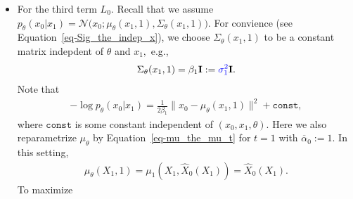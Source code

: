 \documentclass[
]{article}
\theoremstyle{remark}
\begin{document}
\begin{itemize}
  (2023)). DDPM chooses to predict the noise
  \(\overline{\mathcal{E}}_t.\) Then by Equation~\ref{eq-estimator-X0},
  we have the following relation
  \begin{equation}\phantomsection\label{eq-Net_asssume1}{
  \begin{aligned}
    X_t = \sqrt{\overline{\alpha}_t} \cdot \widehat{X}_0(X_t) + \sqrt{1-\overline{\alpha}_t} \cdot \mathtt{Net}_{\theta}(X_t,t).
  \end{aligned}
  }\end{equation} Note that
  \(\widehat{X}_0 = \widehat{X}_0(X_t)=\widehat{X}_0(X_t,\theta).\)
  Hence, we have \[
  \begin{aligned}
    L_{t-1} = \mathbb E_{\substack{X_0\sim q(x_0), \overline{\mathcal{E}}_t\sim \mathcal{N}(\mathbf{0},\mathbf{I})\\ X_0,\overline{\mathcal{E}}_t \text{ are independent} \\ X_t=\sqrt{\overline{\alpha}_t}X_0+\sqrt{1-\overline{\alpha}_t}\cdot \overline{\mathcal{E}}_t}} \biggl( \frac{\beta_t^2}{2\sigma_t^2\alpha_t(1-\overline{\alpha}_t)} \Big\lVert \overline{\mathcal{E}}_t - \mathtt{Net}_{\theta}(X_t,t) \Big\rVert^2 \biggr).
  \end{aligned}
  \]
\item
  For the third term \(L_0.\) Recall that we assume
  \(p_{\theta}(x_0 \vert x_1) = \mathcal{N}\bigl(x_0; \mu_{\theta}(x_1,1), \Sigma_{\theta}(x_1,1) \bigr).\)
  For convience (see Equation~\ref{eq-Sig_the_indep_x}), we choose
  \(\Sigma_{\theta}(x_1,1)\) to be a constant matrix indepdent of
  \(\theta\) and \(x_1,\) e.g., \[
  \begin{aligned}
    \Sigma_{\theta}(x_1,1) = \beta_1 \mathbf{I}:={\color{blue}{\sigma_1^2}} \mathbf{I}.
  \end{aligned}
  \] Note that \[
  \begin{aligned}
    -\log p_{\theta} (x_0\vert x_1) = \frac{1}{2\beta_1} \big\lVert x_0 - \mu_{\theta}(x_1,1) \big\rVert^2 + \mathtt{const} ,
  \end{aligned}
  \] where \(\mathtt{const}\) is some constant independent of
  \((x_0,x_1,\theta).\) Here we also reparametrize \(\mu_{\theta}\) by
  Equation~\ref{eq-mu_the_mu_t} for \(t=1\) with
  \(\overline{\alpha}_0:=1.\) In this setting, \[
  \begin{aligned}
    \mu_\theta(X_1,1)=\mu_1(X_1,\widehat{X}_0(X_1))=\widehat{X}_0(X_1).
  \end{aligned}
  \] To maximize \[
  \begin{aligned}

\end{aligned}\]
\end{itemize}
\end{document}

